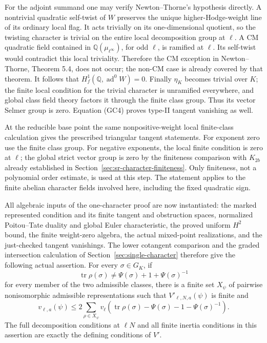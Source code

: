For the adjoint summand one may verify
Newton--Thorne's hypothesis directly.
A nontrivial quadratic self-twist of \(W\)
preserves the unique higher-Hodge-weight line
of its ordinary local flag. It acts trivially
on its one-dimensional quotient, so the
twisting character is trivial on the entire
local decomposition group at \(\ell\).
A CM quadratic field contained in
\(\mathbb Q(\mu_{\ell^\infty})\), for odd
\(\ell\), is ramified at \(\ell\).
Its self-twist would contradict this
local triviality. Therefore the CM exception
in Newton--Thorne, Theorem 5.4, does not occur;
the non-CM case is already covered by that
theorem. It follows that
\(H_f^1(\mathbb Q,\operatorname{ad}^0W)=0\).
Finally \(\eta_K\) becomes trivial over \(K\);
the finite local condition for the trivial
character is unramified everywhere, and
global class field theory factors it through
the finite class group. Thus its vector
Selmer group is zero. Equation (GC4) proves
type-II tangent vanishing as well.

At the reducible base point the same
nonpositive-weight local finite-class
calculation gives the prescribed triangular
tangent statements.
For exponent zero use the finite class group.
For negative exponents, the local finite
condition is zero at \(\ell\); the global
strict vector group is zero by the finiteness
comparison with \(K_{2b}\) already established
in Section~\ref{sec:sr-character-finiteness}.
Only finiteness, not a polynomial order
estimate, is used at this step.
The statement applies to the finite abelian
character fields involved here, including
the fixed quadratic sign.

All algebraic inputs of the one-character
proof are now instantiated: the marked
represented condition and its finite tangent
and obstruction spaces, normalized
Poitou--Tate duality and global Euler
characteristic, the proved uniform
\(H^2\) bound, the finite weight-zero
algebra, the actual mixed-point
realizations, and the just-checked
tangent vanishings.
The lower cotangent comparison and the
graded intersection calculation of
Section~\ref{sec:single-character}
therefore give the following actual assertion.
For every \(\sigma\in G_K\), if
\[
  \operatorname{tr}\rho(\sigma)\ne
       \Psi(\sigma)+1+\Psi(\sigma)^{-1}
\]
for every member of the two admissible
classes, there is a finite set \(X_\psi\)
of pairwise nonisomorphic admissible
representations such that \(V'_{\ell,N,a}(\psi)\)
is finite and
\[
 v_{\ell,a}(\psi)\le
 2\sum_{\rho\in X_\psi}
 v_\ell\!\left(\operatorname{tr}\rho(\sigma)
                   -\Psi(\sigma)-1-\Psi(\sigma)^{-1}\right).
 \tag{GC5}
\]
The full decomposition conditions at
\(\ell N\) and all finite inertia conditions
in this assertion are exactly the defining
conditions of \(V'\).


